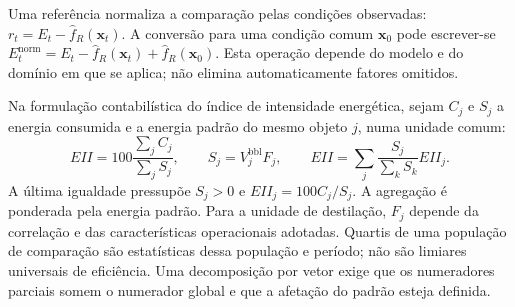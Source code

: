 Uma referência normaliza a comparação pelas condições observadas: $r_t=E_t-\widehat f_R(\boldsymbol x_t)$. A conversão para uma condição comum $\boldsymbol x_0$ pode escrever-se $E_t^{\mathrm{norm}}=E_t-\widehat f_R(\boldsymbol x_t)+\widehat f_R(\boldsymbol x_0)$. Esta operação depende do modelo e do domínio em que se aplica; não elimina automaticamente fatores omitidos.

Na formulação contabilística do índice de intensidade energética, sejam $C_j$ e $S_j$ a energia consumida e a energia padrão do mesmo objeto $j$, numa unidade comum:
\begin{equation}
EII=100\frac{\sum_jC_j}{\sum_jS_j},
\qquad S_j=V_j^{\mathrm{bbl}}F_j,
\qquad EII=\sum_j\frac{S_j}{\sum_kS_k}EII_j.
\label{eq:mat-eii}
\end{equation}
A última igualdade pressupõe $S_j>0$ e $EII_j=100C_j/S_j$. A agregação é ponderada pela energia padrão. Para a unidade de destilação, $F_j$ depende da correlação e das características operacionais adotadas. Quartis de uma população de comparação são estatísticas dessa população e período; não são limiares universais de eficiência. Uma decomposição por vetor exige que os numeradores parciais somem o numerador global e que a afetação do padrão esteja definida.


